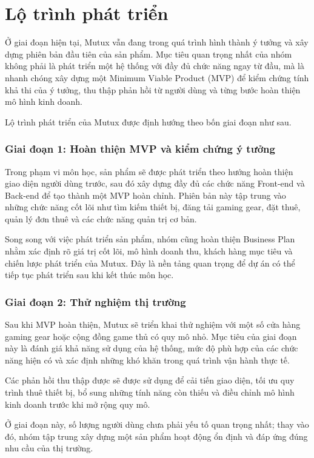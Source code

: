 \section{Lộ trình phát triển}


Ở giai đoạn hiện tại, Mutux vẫn đang trong quá trình hình thành ý tưởng và xây dựng phiên bản đầu tiên của sản phẩm. Mục tiêu quan trọng nhất của nhóm không phải là phát triển một hệ thống với đầy đủ chức năng ngay từ đầu, mà là nhanh chóng xây dựng một Minimum Viable Product (MVP) để kiểm chứng tính khả thi của ý tưởng, thu thập phản hồi từ người dùng và từng bước hoàn thiện mô hình kinh doanh.

Lộ trình phát triển của Mutux được định hướng theo bốn giai đoạn như sau.

\subsubsection{Giai đoạn 1: Hoàn thiện MVP và kiểm chứng ý tưởng}
Trong phạm vi môn học, sản phẩm sẽ được phát triển theo hướng hoàn thiện giao diện người dùng trước, sau đó xây dựng đầy đủ các chức năng Front-end và Back-end để tạo thành một MVP hoàn chỉnh. Phiên bản này tập trung vào những chức năng cốt lõi như tìm kiếm thiết bị, đăng tải gaming gear, đặt thuê, quản lý đơn thuê và các chức năng quản trị cơ bản.

Song song với việc phát triển sản phẩm, nhóm cũng hoàn thiện Business Plan nhằm xác định rõ giá trị cốt lõi, mô hình doanh thu, khách hàng mục tiêu và chiến lược phát triển của Mutux. Đây là nền tảng quan trọng để dự án có thể tiếp tục phát triển sau khi kết thúc môn học.

\subsubsection{Giai đoạn 2: Thử nghiệm thị trường}
Sau khi MVP hoàn thiện, Mutux sẽ triển khai thử nghiệm với một số cửa hàng gaming gear hoặc cộng đồng game thủ có quy mô nhỏ. Mục tiêu của giai đoạn này là đánh giá khả năng sử dụng của hệ thống, mức độ phù hợp của các chức năng hiện có và xác định những khó khăn trong quá trình vận hành thực tế.

Các phản hồi thu thập được sẽ được sử dụng để cải tiến giao diện, tối ưu quy trình thuê thiết bị, bổ sung những tính năng còn thiếu và điều chỉnh mô hình kinh doanh trước khi mở rộng quy mô.

Ở giai đoạn này, số lượng người dùng chưa phải yếu tố quan trọng nhất; thay vào đó, nhóm tập trung xây dựng một sản phẩm hoạt động ổn định và đáp ứng đúng nhu cầu của thị trường.

